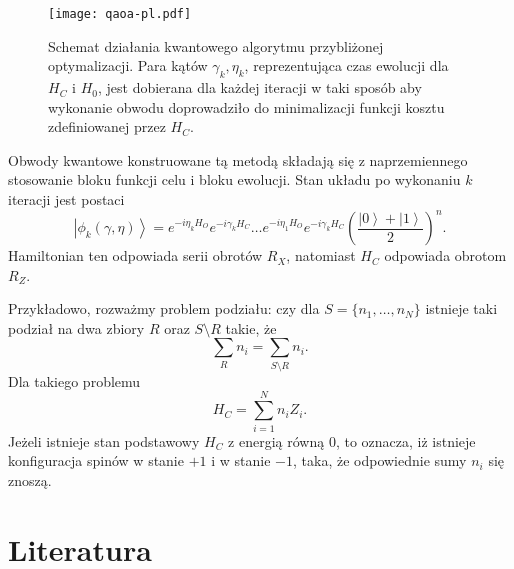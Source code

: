 \documentclass[a4paper,11pt]{article}
\newcommand{\ket}[1]{\left|{#1}\right\rangle}
\begin{document}
\begin{figure}
	\begin{center}
		\texttt{[image: qaoa-pl.pdf]}
		\caption{Schemat działania kwantowego algorytmu przybliżonej optymalizacji. Para kątów $\gamma_k,\eta_k$, reprezentująca czas ewolucji dla $H_C$ i $H_0$, jest dobierana dla każdej iteracji w taki sposób aby wykonanie obwodu doprowadziło do minimalizacji funkcji kosztu zdefiniowanej przez $H_C$.}
	\end{center}
\end{figure}

Obwody kwantowe konstruowane tą metodą składają się z naprzemiennego stosowanie bloku funkcji celu i bloku ewolucji. Stan układu po wykonaniu $k$ iteracji jest postaci
\[
\ket{\phi_k(\gamma,\eta)} = e^{-i\eta_k H_O} e^{-i\gamma_k H_C}\dots e^{-i\eta_1 H_O}e^{-i\gamma_k H_C}\left(\frac{\ket{0}+\ket{1}}{2}\right)^n.
\]
Hamiltonian ten odpowiada serii obrotów $R_X$, natomiast $H_C$ odpowiada obrotom $R_Z$. 


Przykładowo, rozważmy problem podziału: czy dla $S=\{n_1,\dots,n_N\}$ istnieje taki podział na dwa zbiory $R$ oraz $S \setminus R$ takie, że
\[
\sum_{R}n_i = \sum_{S\setminus R} n_i.
\]
Dla takiego problemu
\[
H_C = \sum_{i=1}^N n_i Z_i.
\]
Jeżeli istnieje stan podstawowy $H_C$ z energią równą 0, to oznacza, iż istnieje konfiguracja spinów w stanie $+1$ i w stanie $-1$, taka, że odpowiednie sumy $n_i$ się znoszą.

\newpage 

\hypertarget{literatura}{%
\section*{Literatura}\label{literatura}}
\end{document}
